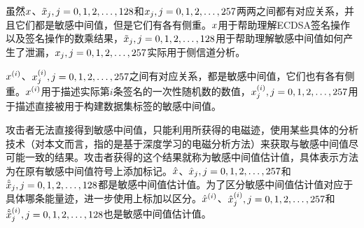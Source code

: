 {	虽然$x$、$\tilde{x}_j,j=0,1,2,\dots,128$和$x_j,j=0,1,2,\dots,257$两两之间都有对应关系，并且它们都是敏感中间值，但是它们有各有侧重。$x$用于帮助理解ECDSA签名操作以及签名操作的数乘结果，$\tilde{x}_j,j=0,1,2,\dots,128$用于帮助理解敏感中间值如何产生了泄漏，$x_j,j=0,1,2,\dots,257$实际用于侧信道分析。
	
	$x^{(i)}$、$x^{(i)}_j,j=0,1,2,\dots,257$之间有对应关系，都是敏感中间值，它们也有各有侧重。$x^{(i)}$用于描述实际第$i$条签名的一次性随机数的数值，$x^{(i)}_j,j=0,1,2,\dots,257$用于描述直接被用于构建数据集标签的敏感中间值。

	攻击者无法直接得到敏感中间值，只能利用所获得的电磁迹，使用某些具体的分析技术（对本文而言，指的是基于深度学习的电磁分析方法）来获取与敏感中间值尽可能一致的结果。攻击者获得的这个结果就称为敏感中间值估计值，具体表示方法为在原有敏感中间值符号上添加$\hat{}$标记。$\hat{x}$、$\hat{x}_j,j=0,1,2,\dots,257$和$\hat{\tilde{x}}_j,j=0,1,2,\dots,128$都是敏感中间值估计值。为了区分敏感中间值估计值对应于具体哪条能量迹，进一步使用上标加以区分。$\hat{x}^{(i)}$、$\hat{x}^{(i)}_j,j=0,1,2,\dots,257$和$\hat{\tilde{x}}^{(i)}_j,j=0,1,2,\dots,128$也是敏感中间值估计值。
	
	
	
}
